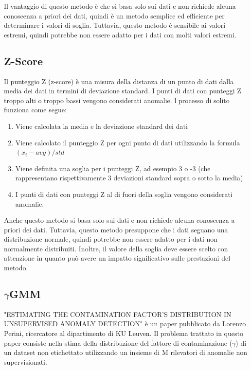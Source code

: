 Il vantaggio di questo metodo è che si basa solo sui dati e non richiede alcuna conoscenza a priori dei dati, quindi è un metodo semplice ed efficiente per determinare i valori di soglia. Tuttavia, questo metodo è sensibile ai valori estremi, quindi potrebbe non essere adatto per i dati con molti valori estremi.

\subsection{Z-Score}
Il punteggio Z (z-score) è una misura della distanza di un punto di dati dalla media dei dati in termini di deviazione standard. I punti di dati con punteggi Z troppo alti o troppo bassi vengono considerati anomalie.
l processo di solito funziona come segue:
\begin{enumerate}
\item Viene calcolata la media e la deviazione standard dei dati
\item Viene calcolato il punteggio Z per ogni punto di dati utilizzando la formula $(x_i - avg) / std$
\item Viene definita una soglia per i punteggi Z, ad esempio 3 o -3 (che rappresentano rispettivamente 3 deviazioni standard sopra o sotto la media)
\item I punti di dati con punteggi Z al di fuori della soglia vengono considerati anomalie.
\end{enumerate}
Anche questo metodo si basa solo sui dati e non richiede alcuna conoscenza a priori dei dati. Tuttavia, questo metodo presuppone che i dati seguano una distribuzione normale, quindi potrebbe non essere adatto per i dati non normalmente distribuiti. Inoltre, il valore della soglia deve essere scelto con attenzione in quanto può avere un impatto significativo sulle prestazioni del metodo.


\subsection{$\gamma$GMM}
"ESTIMATING THE CONTAMINATION FACTOR’S DISTRIBUTION IN UNSUPERVISED ANOMALY DETECTION" è un paper pubblicato da Lorenzo Perini, ricercatore al dipartimento di KU Leuven.
Il problema trattato in questo paper consiste nella stima della distribuzione del fattore di contaminazione ($\gamma$) di un dataset non etichettato utilizzando un insieme di M rilevatori di anomalie non supervisionati. 

